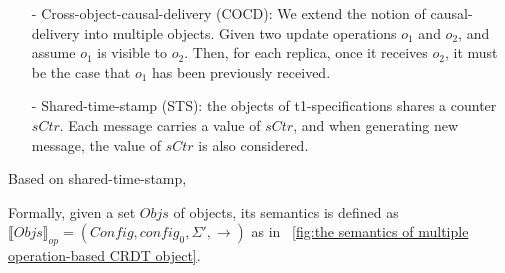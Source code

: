 \begin{itemize}
\setlength{\itemsep}{0.5pt}
\item[-] Cross-object-causal-delivery (COCD): We extend the notion of causal-delivery into multiple objects. Given two update operations $o_1$ and $o_2$, and assume $o_1$ is visible to $o_2$. Then, for each replica, once it receives $o_2$, it must be the case that $o_1$ has been previously received.

\item[-] Shared-time-stamp (STS): the objects of t1-specifications shares a counter $\mathit{sCtr}$. Each message carries a value of $\mathit{sCtr}$, and when generating new message, the value of $\mathit{sCtr}$ is also considered.
\end{itemize}



Based on shared-time-stamp,



Formally, given a set $\mathit{Objs}$ of objects, its semantics is defined as $\llbracket \mathit{Objs} \rrbracket_{\mathit{op}} = (\mathit{Config},\mathit{config}_0,\Sigma',\rightarrow)$ as in \figurename~\ref{fig:the semantics of multiple operation-based CRDT object}.


